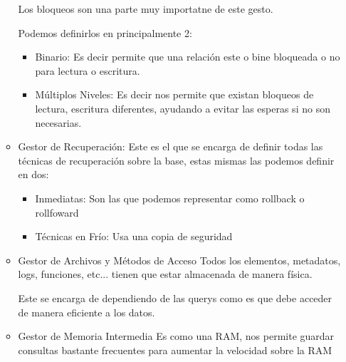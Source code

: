 \documentclass[12pt, fleqn]{report}                             %
\theoremstyle{break}                                            %
\begin{document}
\begin{itemize}
\begin{itemize}
                                Los bloqueos son una parte muy importatne de este gesto.

                                Podemos definirlos en principalmente 2:
                                \begin{itemize}
                                    \item Binario:
                                        Es decir permite que una relación este o bine bloqueada
                                        o no para lectura o escritura.
                                    \item Múltiplos Niveles:
                                        Es decir nos permite que existan bloqueos de lectura,
                                        escritura diferentes, ayudando a evitar las esperas si no
                                        son necesarias.
                                \end{itemize}

                            \item Gestor de Recuperación:
                                Este es el que se encarga de definir todas las técnicas de recuperación
                                sobre la base, estas mismas las podemos definir en dos:
                                \begin{itemize}
                                    \item Inmediatas: Son las que podemos representar como rollback o rollfoward
                                    \item Técnicas en Frío: Usa una copia de seguridad
                                \end{itemize}


                            \item Gestor de Archivos y Métodos de Acceso
                                Todos los elementos, metadatos, logs, funciones, etc... tienen que estar
                                almacenada de manera física.

                                Este se encarga de dependiendo de las querys como es que debe acceder de 
                                manera eficiente a los datos.

                            \item Gestor de Memoria Intermedia
                                Es como una RAM, nos permite guardar consultas bastante frecuentes
                                para aumentar la velocidad sobre la RAM
                        \end{itemize}

            \end{itemize}
\end{document}
